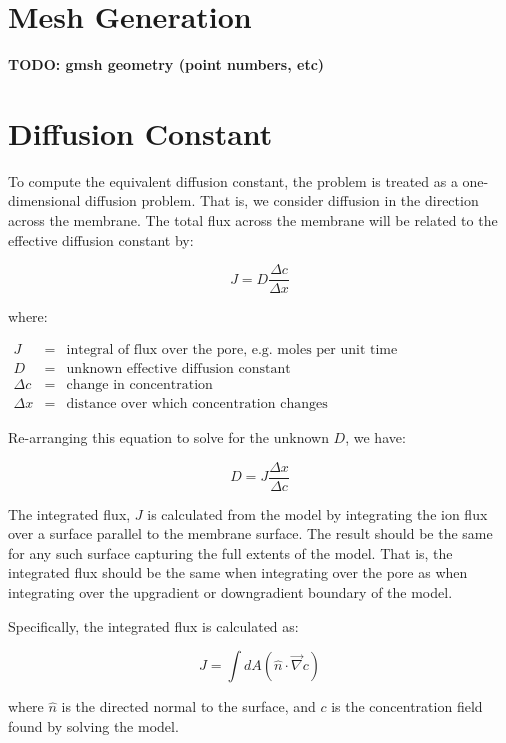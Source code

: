 \documentclass{article}
\begin{document}
\section{Mesh Generation}\label{sec:meshgen}

\textbf{TODO: gmsh geometry (point numbers, etc)}

\section{Diffusion Constant}\label{sec:D}

To compute the equivalent diffusion constant, the problem is treated as a one-dimensional diffusion problem.
That is, we consider diffusion in the direction across the membrane.
The total flux across the membrane will be related to the effective diffusion constant by:

$$J = D \frac{\Delta c}{\Delta x}$$

where:

$\begin{array}{rcl}
J & = & \text{integral of flux over the pore, e.g. moles per unit time} \\
D & = & \text{unknown effective diffusion constant} \\
\Delta c & = & \text{change in concentration} \\
\Delta x & = & \text{distance over which concentration changes}
\end{array}$

Re-arranging this equation to solve for the unknown $D$, we have:

$$D = J \frac{\Delta x}{\Delta c}$$

The integrated flux, $J$ is calculated from the model by integrating
the ion flux over a surface parallel to the membrane surface.
The result should be the same for any such surface capturing the full extents of the model.
That is, the integrated flux should be the same when integrating over the pore as
when integrating over the upgradient or downgradient boundary of the model.

Specifically, the integrated flux is calculated as:

$$J = \int dA \left(\hat{n} \cdot \vec{\nabla} c \right)$$

where $\hat{n}$ is the directed normal to the surface,
and $c$ is the concentration field found by solving the model.
\end{document}
